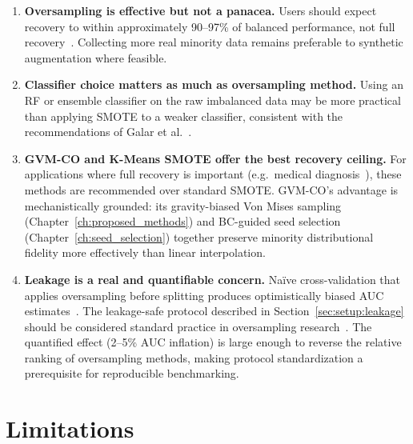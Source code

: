 \begin{enumerate}[leftmargin=*, itemsep=4pt]
  \item \textbf{Oversampling is effective but not a panacea.}
  Users should expect recovery to within approximately 90--97\% of balanced performance, not full recovery~\cite{blagus2013smote, fernandez2018learning}.
  Collecting more real minority data remains preferable to synthetic augmentation where feasible.

  \item \textbf{Classifier choice matters as much as oversampling method.}
  Using an RF or ensemble classifier on the raw imbalanced data may be more practical than applying SMOTE to a weaker classifier, consistent with the recommendations of Galar et al.~\cite{galar2012review}.

  \item \textbf{GVM-CO and K-Means SMOTE offer the best recovery ceiling.}
  For applications where full recovery is important (e.g.\ medical diagnosis~\cite{he2009learning}), these methods are recommended over standard SMOTE.
  GVM-CO's advantage is mechanistically grounded: its gravity-biased Von Mises sampling (Chapter~\ref{ch:proposed_methods}) and BC-guided seed selection (Chapter~\ref{ch:seed_selection}) together preserve minority distributional fidelity more effectively than linear interpolation.

  \item \textbf{Leakage is a real and quantifiable concern.}
  Na\"{i}ve cross-validation that applies oversampling before splitting produces optimistically biased AUC estimates~\cite{kaufman2012leakage, cawley2010over}.
  The leakage-safe protocol described in Section~\ref{sec:setup:leakage} should be considered standard practice in oversampling research~\cite{johnson2019survey}.
  The quantified effect (2--5\% AUC inflation) is large enough to reverse the relative ranking of oversampling methods, making protocol standardization a prerequisite for reproducible benchmarking.
\end{enumerate}


\section{Limitations}
\label{sec:disc:limitations}

